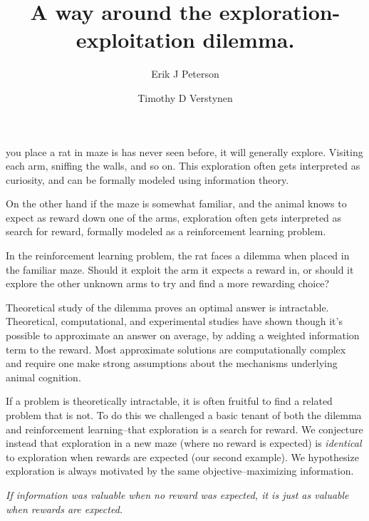 \documentclass[9pt,twocolumn,twoside]{pnas-new}
\title{A way around the exploration-exploitation dilemma.}
\author[a,1]{Erik J Peterson}
\author[a,b]{Timothy D Verstynen}
\affil[a]{Department of Psychology}
\affil[b]{Center for the Neural Basis of Cognition, Carnegie Mellon University, Pittsburgh PA}
\begin{document}
\verticaladjustment{-2pt}
\maketitle


\thispagestyle{firststyle}
you place a rat in maze is has never seen before, it will generally explore. Visiting each arm, sniffing the walls, and so on. This exploration often gets interpreted as curiosity, and can be formally modeled using information theory. 

On the other hand if the maze is somewhat familiar, and the animal knows to expect as reward down one of the arms, exploration often gets interpreted as search for reward, formally modeled as a reinforcement learning problem.

In the reinforcement learning problem, the rat faces a dilemma when placed in the familiar maze. Should it exploit the arm it expects a reward in, or should it explore the other unknown arms to try and find a more rewarding choice? 

Theoretical study of the dilemma proves an optimal answer is intractable. Theoretical, computational, and experimental studies have shown though it's possible to approximate an answer on average, by adding a weighted information term to the reward. Most approximate solutions are computationally complex and require one make strong assumptions about the mechanisms underlying animal cognition. 

If a problem is theoretically intractable, it is often fruitful to find a related problem that is not. To do this we challenged a basic tenant of both the dilemma and reinforcement learning--that exploration is a search for reward. We conjecture instead that exploration in a new maze (where no reward is expected) is \textit{identical} to exploration when rewards are expected (our second example). We hypothesize exploration is always motivated by the same objective--maximizing information.

\textit{If information was valuable when no reward was expected, it is just as valuable when rewards are expected.}
\end{document}
